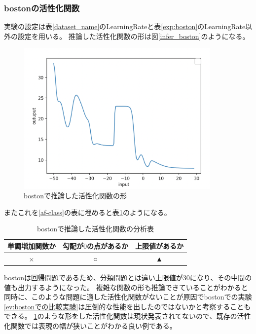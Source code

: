 \subsubsection{bostonの活性化関数}
実験の設定は表\ref{dataset_name}のLearningRateと表\ref{exp:boston}のLearningRate以外の設定を用いる。
推論した活性化関数の形は図\ref{infer_boston}のようになる。
\begin{figure}[hbtp]
    \begin{center}
        \includegraphics[width=10cm]{asset/boston-0.00001.png}
            \caption{bostonで推論した活性化関数の形}
            \label{ifer_boston}
    \end{center}
\end{figure}

またこれを\ref{af-class}の表に埋めると表\ref{anal_boston}のようになる。
\begin{table}[htbp]
    \begin{center}
        \caption{bostonで推論した活性化関数の分析表}
        \label{anal_boston}
        \vspace{2mm} 
        \begin{tabular}{ |c|c|c| }
        単調増加関数か & 勾配が$ 0 $の点があるか & 上限値があるか   \\
        \hline
        × & ○ & ▲   \\
        \end{tabular}
    \end{center}
\end{table}


bostonは回帰問題であるため、分類問題とは違い上限値が30になり、その中間の値も出力するようになった。
複雑な関数の形も推論できていることがわかると同時に、このような問題に適した活性化関数がないことが原因でbostonでの実験\ref{ev:bostonでの比較実験}は圧倒的な性能を出したのではないかと考察することもできる。
\ref{ifer_boston}のような形をした活性化関数は現状発表されてないので、既存の活性化関数では表現の幅が狭いことがわかる良い例である。





